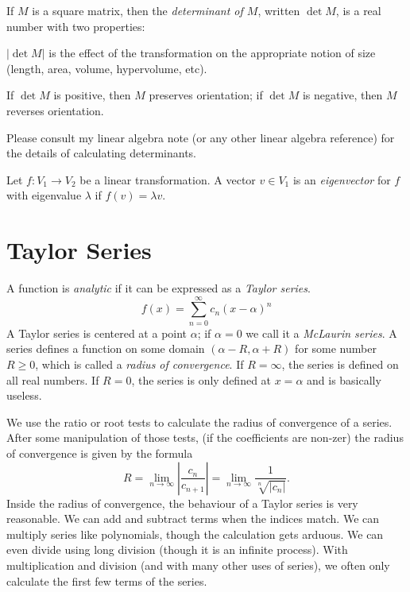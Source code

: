 \documentclass[fleqn,letterpaper]{report}
\begin{document}
\begin{defn}
If $M$ is a square matrix, then the \emph{determinant of $M$},
written $\det M$, is a real number with two properties:
\begin{smallitemize}
\item $|\det M|$ is the effect of the transformation on the
appropriate notion of size (length, area, volume, hypervolume,
etc).
\item If $\det M$ is positive, then $M$ preserves orientation;
if $\det M$ is negative, then $M$ reverses orientation.
\end{smallitemize}
Please consult my linear algebra note (or any other linear
algebra reference) for the details of calculating
determinants.
\end{defn}

\begin{defn}
Let $f:V_1 \rightarrow V_2$ be a linear transformation. A
vector $v \in V_1$ is an \emph{eigenvector} for $f$ with
eigenvalue $\lambda$ if $f(v) = \lambda v$. 
\end{defn}

\section{Taylor Series}
\label{taylor-series}

\begin{defn}
A function is \emph{analytic} if it can be expressed as a
\emph{Taylor series}.
\begin{equation*}
f(x) = \sum_{n=0}^\infty c_n (x-\alpha)^n
\end{equation*}
A Taylor series is centered at a point $\alpha$; if $\alpha =
0$ we call it a \emph{McLaurin series}. A series defines a
function on some domain $(\alpha-R,\alpha+R)$ for some number
$R \geq 0$, which is called a \emph{radius of convergence}. If
$R=\infty$, the series is defined on all real numbers. If
$R=0$, the series is only defined at $x=\alpha$ and is
basically useless.
\end{defn}

We use the ratio or root tests to calculate the radius of
convergence of a series. After some manipulation of those
tests, (if the coefficients are non-zer) the radius of
convergence is given by the formula 
\begin{equation*}
R = \lim_{n \rightarrow \infty} \left| \frac{c_n}{c_{n+1}}
\right| = \lim_{n \rightarrow \infty}
\frac{1}{\sqrt[n]{|c_n|}}.
\end{equation*}
Inside the radius of convergence, the behaviour of a Taylor
series is very reasonable. We can add and subtract terms when
the indices match. We can multiply series like polynomials,
though the calculation gets arduous. We can even divide using
long division (though it is an infinite process). With
multiplication and division (and with many other uses of
series), we often only calculate the first few terms of the series. 
\end{document}
